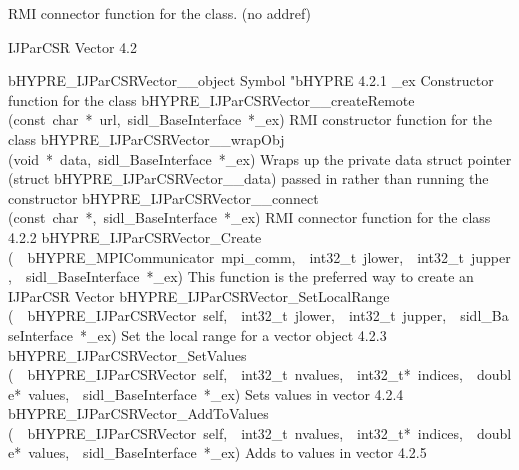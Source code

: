 \documentclass{article}
\begin{document}
\begin{cxxentry}
\begin{cxxentry}
\begin{cxxvariable}
\begin{cxxdoc}
RMI connector function for the class. (no addref)
\end{cxxdoc}
\end{cxxvariable}
\end{cxxentry}
\begin{cxxentry}
{}
        {IJParCSR Vector}
        {}
        {
}
        {4.2}
\begin{cxxnames}
        {bHYPRE\_IJParCSRVector\_\_object}
        {}
        {
Symbol "bHYPRE}
        {4.2.1}
        {\_ex}
        {}
        {
Constructor function for the class}
        {}
\label{cxx.4.2.14}
        {bHYPRE\_IJParCSRVector\_\_createRemote}
        {(const\ char\ *\ url,\ sidl\_BaseInterface\ *\_ex)}
        {
RMI constructor function for the class}
        {}
\label{cxx.4.2.15}
        {bHYPRE\_IJParCSRVector\_\_wrapObj}
        {(void\ *\ data,\ sidl\_BaseInterface\ *\_ex)}
        {
Wraps up the private data struct pointer (struct bHYPRE\_IJParCSRVector\_\_data) passed in rather than running the constructor}
        {}
\label{cxx.4.2.16}
        {bHYPRE\_IJParCSRVector\_\_connect}
        {(const\ char\ *,\ sidl\_BaseInterface\ *\_ex)}
        {
RMI connector function for the class}
        {4.2.2}
        {bHYPRE\_IJParCSRVector\_Create}
        {(\ \ bHYPRE\_MPICommunicator\ mpi\_comm,\ \ int32\_t\ jlower,\ \ int32\_t\ jupper,\ \ sidl\_BaseInterface\ *\_ex)}
        {
This function is the preferred way to create an IJParCSR Vector}
        {}
\label{cxx.4.2.17}
        {bHYPRE\_IJParCSRVector\_SetLocalRange}
        {(\ \ bHYPRE\_IJParCSRVector\ self,\ \ int32\_t\ jlower,\ \ int32\_t\ jupper,\ \ sidl\_BaseInterface\ *\_ex)}
        {
Set the local range for a vector object}
        {4.2.3}
        {bHYPRE\_IJParCSRVector\_SetValues}
        {(\ \ bHYPRE\_IJParCSRVector\ self,\ \ int32\_t\ nvalues,\ \ int32\_t*\ indices,\ \ double*\ values,\ \ sidl\_BaseInterface\ *\_ex)}
        {
Sets values in vector}
        {4.2.4}
        {bHYPRE\_IJParCSRVector\_AddToValues}
        {(\ \ bHYPRE\_IJParCSRVector\ self,\ \ int32\_t\ nvalues,\ \ int32\_t*\ indices,\ \ double*\ values,\ \ sidl\_BaseInterface\ *\_ex)}
        {
Adds to values in vector}
        {4.2.5}

\end{cxxnames}
\end{cxxentry}
\end{cxxentry}
\end{document}
